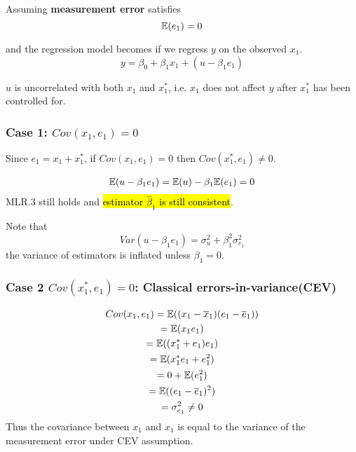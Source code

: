 \documentclass[]{article}
\begin{document}
			\begin{assumption}
				Assuming \textbf{measurement error} satisfies
				\[
					\mathbb{E}({e_1}) = 0
				\]
			\end{assumption}
			
			and the regression model becomes if we regress $y$ on the observed $x_1$.
			\begin{equation}
				y = \beta_0 + \beta_1 x_1 + (u - \beta_1 e_1)
			\end{equation}
			\begin{assumption}
				$u$ is uncorrelated with both $x_1$ and $x_1^{*}$, i.e. $x_1$ does not affect $y$ after $x_1^*$ has been controlled for.
			\end{assumption}
			
			\subsubsection{Case 1: $Cov(x_1, e_1) = 0$}
				\begin{remark}
					Since $e_1 = x_1 + x_1^*$, if $Cov(x_1, e_1) = 0$ then $Cov(x_1^*, e_1) \neq 0$.
				\end{remark}
				\begin{remark}
					\begin{gather*}
						\mathbb{E}({u-\beta_1 e_1}) = \mathbb{E}({u}) - \beta_1 \mathbb{E}({e_1}) = 0
					\end{gather*}
					MLR.3 still holds and \hl{estimator $\hat{\beta}_1$ is still consistent}.
				\end{remark}
				
				\begin{remark}
					Note that 
					\[
						Var(u - \beta_1 e_1) = \sigma_u^2 + \beta_1^2 \sigma_{e_1}^2
					\]
					the variance of estimators is inflated unless $\beta_1 = 0$.
				\end{remark}
				
			\subsubsection{Case 2 $Cov(x_1^{*}, e_1) = 0$: Classical errors-in-variance(CEV)}
				\begin{remark}
					\begin{gather*}
						Cov(x_1, e_1) = \mathbb{E}({(x_1 - \overline{x}_1)(e_1 - \overline{e}_1)}) \\
						= \mathbb{E}({x_1 e_1}) \\
						= \mathbb{E}({(x_1^{*} + e_1) e_1}) \\
						= \mathbb{E}({x_1^{*}e_1 + e_1^2}) \\
						= 0 + \mathbb{E}({e_1^2}) \\
						= \mathbb{E}({(e_1 - \overline{e}_1)^2}) \\
						= \sigma_{e_1}^2 \neq 0
					\end{gather*}
				Thus the covariance between $x_1$ and $x_1$ is equal to the variance of the measurement error under CEV assumption.
				\end{remark}
				
\end{document}
